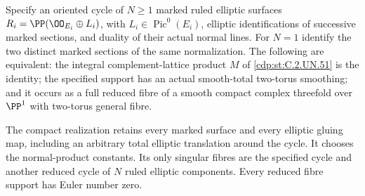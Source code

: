 
\begin{proposition}\label{cdp:st:C.2.UN.55}
Specify an oriented cycle of $N\geq1$ marked ruled elliptic surfaces
$R_i=\PP(\OO_{E_i}\oplus L_i)$, with
$L_i\in\operatorname{Pic}^0(E_i)$, elliptic identifications of
successive marked sections, and duality of their actual normal
lines. For $N=1$ identify the two distinct marked sections of
the same normalization. The following are equivalent:
the integral complement-lattice product $M$ of \ref{cdp:st:C.2.UN.51} is the
identity; the specified support has an actual smooth-total
two-torus smoothing; and it occurs as a full reduced fibre of
a smooth compact complex threefold over $\PP^1$ with two-torus
general fibre.

The compact realization retains every marked surface and every
elliptic gluing map, including an arbitrary total elliptic
translation around the cycle. It chooses the normal-product
constants. Its only singular fibres are the specified cycle and
another reduced cycle of $N$ ruled elliptic components. Every
reduced fibre support has Euler number zero.
\end{proposition}


